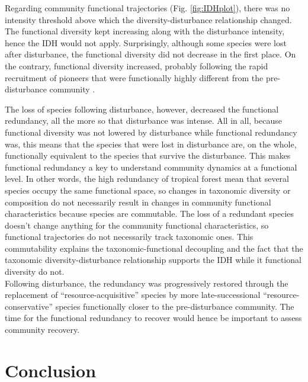 \documentclass[fleqn,10pt]{ArtEcoFoG} %
\begin{document}
\color{red}Regarding community functional trajectories (Fig. \ref{fig:IDHplot}), there was no intensity threshold above which the diversity-disturbance relationship changed. The functional diversity kept increasing along with the disturbance intensity, hence the IDH would not apply. Surprisingly, although some species were lost after disturbance, the functional diversity did not decrease in the first place. On the contrary, functional diversity increased, probably following the rapid recruitment of pioneers that were functionally highly different from the pre-disturbance community \citep{Denslow1980, Molino2001}.

The loss of species following disturbance, however, decreased the functional redundancy, all the more so that disturbance was intense. All in all, because functional diversity was not lowered by disturbance while functional redundancy was, this means that the species that were lost in disturbance are, on the whole, functionally equivalent to the species that survive the disturbance. This makes functional redundancy a key to understand community dynamics at a functional level. In other words, the high redundancy of tropical forest mean that several species occupy the same functional space, so changes in taxonomic diversity or composition do not necessarily result in changes in community functional characteristics because species are commutable. The loss of a redundant species doesn't change anything for the community functional characteristics, so functional trajectories do not necessarily track taxonomic ones. This commutability explains the taxonomic-functional decoupling and the fact that the taxonomic diversity-disturbance relationship supports the IDH while it functional diversity do not.\\
Following disturbance, the redundancy was progressively restored through the replacement of ``resource-acquisitive'' species by more late-successional ``resource-conservative'' species functionally closer to the pre-disturbance community.
The time for the functional redundancy to recover would hence be important to assess community recovery.
\color{black}

\hypertarget{conclusion}{%
\section{Conclusion}\label{conclusion}}
\end{document}
